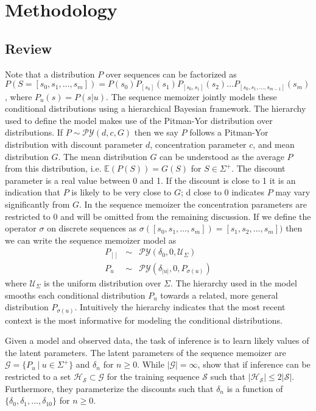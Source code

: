 \section{Methodology}
\label{section:methodology}
\newcommand{\PY}{\ensuremath{\mathcal{P}\mathcal{Y}}}

\subsection{Review}

Note that a distribution $P$ over sequences can be factorized as $P(S = [s_0, s_1, \ldots, s_m]) = P(s_0)P_{[s_0]}(s_1)P_{[s_0,s_1]}(s_2) \ldots P_{[s_0,s_1,\ldots,s_{m-1}]}(s_m)$, where $P_u(s) = P(s | u)$.  The sequence memoizer jointly models these conditional distributions using a hierarchical Bayesian framework.  The hierarchy used to define the model makes use of the Pitman-Yor \citep{Pitman1997} distribution over distributions. If $P \sim \PY(d,c,G)$ then we say $P$ follows a Pitman-Yor distribution with discount parameter $d$, concentration parameter $c$, and mean distribution $G$.  The mean distribution $G$ can be understood as the average $P$ from this distribution, i.e. $\mathbb{E}(P(S)) = G(S)$ for $S \in \Sigma^{+}$.  The discount parameter is a real value between 0 and 1.  If the discount is close to 1 it is an indication that $P$ is likely to be very close to $G$; d close to 0 indicates $P$ may vary significantly from $G$.  In the sequence memoizer the concentration parameters are restricted to 0 and will be omitted from the remaining discussion. If we define the operator $\sigma$ on discrete sequences as $\sigma([s_0, s_1, \ldots, s_m]) = [s_1,s_2, \ldots, s_m])$ then we can write the sequence memoizer model as 
%
\begin{eqnarray*}
	P_{[ ]} &\sim& \PY(\delta_0,0,\mathcal{U}_{\Sigma})\\
	P_{u} &\sim& \PY(\delta_{|u|}, 0, P_{\sigma(u)})
\end{eqnarray*}
\noindent where $\mathcal{U}_{\Sigma}$ is the uniform distribution over $\Sigma$.  The hierarchy used in the model smooths each conditional distribution $P_u$ towards a related, more general distribution $P_{\sigma(u)}$.  Intuitively the hierarchy indicates that the most recent context is the most informative for modeling the conditional distributions.

Given a model and observed data,  the task of inference is to learn likely values of the latent parameters.  The latent parameters of the sequence memoizer are  $\mathcal{G} = \{P_u \ | \ u \in \Sigma^{+} \}$ and $\delta_n$ for $n \geq 0$.  While $| \mathcal{G}| = \infty$, \cite{Wood2009} show that if inference can be restricted to a set $\mathcal{H_\mathcal{S}} \subset \mathcal{G}$ for the training sequence $\mathcal{S}$ such that $|\mathcal{H}_\mathcal{S} | \leq 2 |\mathcal{S}|$.  Furthermore, they parameterize the discounts such that $\delta_n$ is a function of $\{\delta_0, \delta_1, \ldots, \delta_10 \}$ for $n \geq 0$.  



